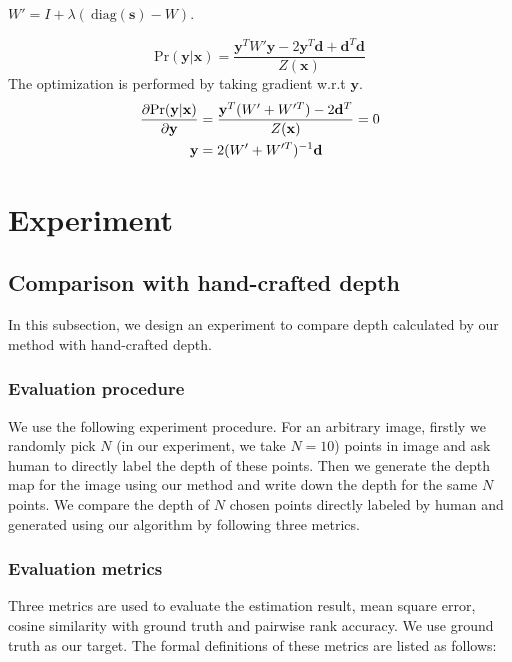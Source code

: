 \documentclass[10pt,twocolumn,letterpaper]{article}
\begin{document}
$W' = I+\lambda(\ \text{diag}(\mathbf{s}) - W ).$

\begin{equation}
\text{Pr}(\mathbf{y}|\mathbf{x}) = \frac{\mathbf{y}^T W'\mathbf{y}-2\mathbf{y}^T\mathbf{d}+\mathbf{d}^T\mathbf{d} }{Z(\mathbf{x})}
\end{equation}
The optimization is performed by taking gradient w.r.t $\mathbf{y}$.
\begin{align}
\frac{\partial{\text{Pr}(\mathbf{y}|\mathbf{x})}}{\partial\mathbf{y}} &= \frac{\mathbf{y} ^T(W'+W'^T)-2\mathbf{d}^T}{Z(\mathbf{x})} = 0 \notag \\
\mathbf{y} &= 2(W'+W'^T)^{-1}\mathbf{d}
\end{align}

\section{Experiment}
\subsection{Comparison with hand-crafted depth}
In this subsection, we design an experiment to compare depth calculated by our method with hand-crafted depth. 
\subsubsection{Evaluation procedure}
\text{\ \ \ \ }We use the following experiment procedure. For an arbitrary image, firstly we randomly pick $N$ (in our experiment, we take $N = 10$) points in image and ask human to directly label the depth of these points. Then we generate the depth map for the image using our method and write down the depth for the same $N$ points. We compare the depth of $N$ chosen points directly labeled by human and generated using our algorithm by following three metrics.

\subsubsection{Evaluation metrics}
\text{\ \ \ } Three metrics are used to evaluate the estimation result, \ie mean square error, cosine similarity with ground truth and pairwise rank accuracy. We use ground truth as our target. The formal definitions of these metrics are listed as follows:
\end{document}
